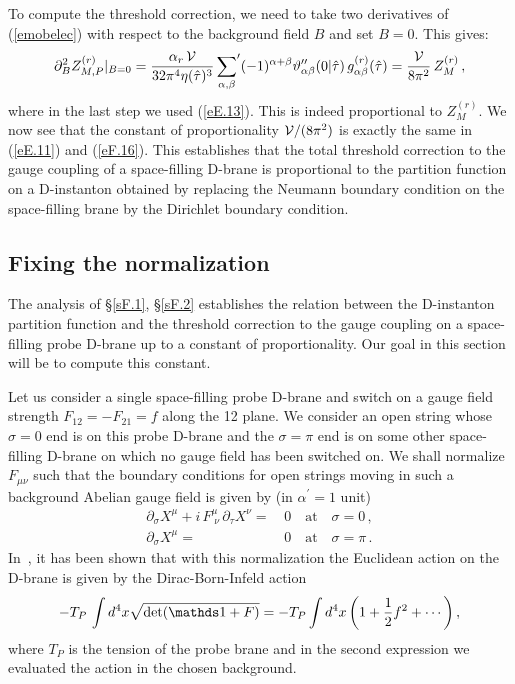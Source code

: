 \documentclass[12pt,a4paper]{article}
\newcommand{\be}{\begin{equation}}
\newcommand{\ee}{\end{equation}}
\newcommand{\refb}[1]{(\ref{#1})}
\newcommand{\p}{\partial}
\def\({\left(}
\def\){\right)}
\newcommand{\vt}{\vartheta}
\newcommand{\VV}{{\cal V}}
\def\gr{g^{(r)}}
\def\Zr{Z^{(r)}}
\def\htau{\hat\tau}
\begin{document}
To compute the threshold correction, we need to take two derivatives of
\refb{emobelec} with respect to the background field $B$ and set $B=0$. This gives:
\be
\label{eF.16}
\p_B^2 \Zr_{M,P}|_{B=0}=\frac{\alpha_r\,\VV}{ 32\pi^{4} \eta(\htau)^3}\,
{\sum_{\alpha,\beta}}' (-1)^{\alpha+\beta} \vt''_{\alpha\beta}(0|\htau)\,
\gr_{\alpha\beta}(\htau) = {\VV\over 8\pi^2} \, \Zr_{M}\, ,
\ee
where in the last step we used
\refb{eE.13}. This is indeed proportional to $\Zr_{M}$.
We now see that the constant of proportionality $\VV/(8\pi^2)$
is exactly the same in \refb{eE.11} and \refb{eF.16}.
This establishes that the total threshold
correction to the gauge coupling of a space-filling D-brane is proportional to the partition
function on a D-instanton obtained by replacing the Neumann boundary condition on the
space-filling brane by the Dirichlet boundary condition.


\subsection{Fixing the normalization} \label{sF.4}

The analysis of \S\ref{sF.1}, \S\ref{sF.2} establishes the relation between the D-instanton
partition function and the threshold correction to the gauge coupling on a space-filling
probe D-brane up to a constant of proportionality.
Our goal in this section will be to compute this constant.

Let us consider a single space-filling probe D-brane and switch on a gauge field strength
$F_{12}=-F_{21}=f$ along the 12 plane. We consider an open string whose $\sigma=0$ end is on this probe D-brane and
the $\sigma=\pi$ end is on some other space-filling D-brane on which no gauge field has
been switched on. We shall normalize $F_{\mu\nu}$ such that
the boundary conditions for open strings moving in such a
background Abelian gauge field is given by (in $\alpha^\prime = 1$ unit)
\be
\begin{split} \label{bc}
\partial_\sigma X^\mu + i \, F^{\mu}_{\; \nu} \, \partial_\tau X^\nu =&\,  0
\quad  \text{at} \quad \sigma =0\, ,
\\
\partial_\sigma X^\mu=&\,  0 \quad  \text{at} \quad \sigma =\pi\, .
\end{split}
\ee
In~\cite{Abouelsaood:1986gd}, it has been shown that with this normalization the
Euclidean action on
the D-brane is given by the Dirac-Born-Infeld action
\be \label{eDBI}
-T_P\, \int d^4 x \sqrt{\det ({\mathds 1}+F)} = -T_P \int d^4 x \(1+{1\over 2} f^2 + \cdots\) ,
\ee
where $T_P$ is the tension of the probe brane and
in the second expression we evaluated the action in the chosen background.
\end{document}
